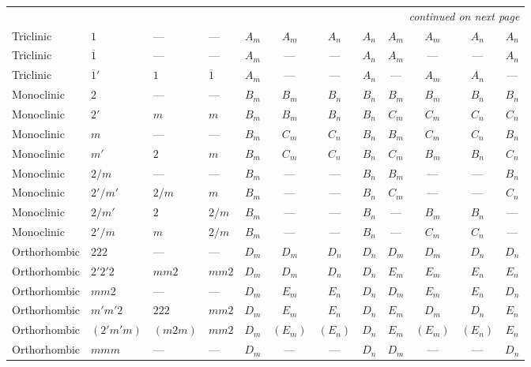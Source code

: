 \documentclass[a4paper,11pt]{article}
\newcommand{\ob}[1]{\overline{#1}}
\begin{document}
\begin{landscape}
\begin{longtable}{l l l l *{4}{c} *{4}{c}}
\midrule
\endhead
\midrule
\multicolumn{12}{r}{\footnotesize\itshape continued on next page}\\
\endfoot
\bottomrule
\endlastfoot
Triclinic & $1$ & --- & --- & $A_m$ & $A_m$ & $A_n$ & $A_n$ & $A_m$ & $A_m$ & $A_n$ & $A_n$ \\
Triclinic & $\ob{1}$ & --- & --- & $A_m$ & --- & --- & $A_n$ & $A_m$ & --- & --- & $A_n$ \\
Triclinic & $\ob{1}'$ & $1$ & $\ob{1}$ & $A_m$ & --- & --- & $A_n$ & --- & $A_m$ & $A_n$ & --- \\
\addlinespace
Monoclinic & $2$ & --- & --- & $B_m$ & $B_m$ & $B_n$ & $B_n$ & $B_m$ & $B_m$ & $B_n$ & $B_n$ \\
Monoclinic & $2'$ & $m$ & $m$ & $B_m$ & $B_m$ & $B_n$ & $B_n$ & $C_m$ & $C_m$ & $C_n$ & $C_n$ \\
Monoclinic & $m$ & --- & --- & $B_m$ & $C_m$ & $C_n$ & $B_n$ & $B_m$ & $C_m$ & $C_n$ & $B_n$ \\
Monoclinic & $m'$ & $2$ & $m$ & $B_m$ & $C_m$ & $C_n$ & $B_n$ & $C_m$ & $B_m$ & $B_n$ & $C_n$ \\
Monoclinic & $2/m$ & --- & --- & $B_m$ & --- & --- & $B_n$ & $B_m$ & --- & --- & $B_n$ \\
Monoclinic & $2'/m'$ & $2/m$ & $m$ & $B_m$ & --- & --- & $B_n$ & $C_m$ & --- & --- & $C_n$ \\
Monoclinic & $2/m'$ & $2$ & $2/m$ & $B_m$ & --- & --- & $B_n$ & --- & $B_m$ & $B_n$ & --- \\
Monoclinic & $2'/m$ & $m$ & $2/m$ & $B_m$ & --- & --- & $B_n$ & --- & $C_m$ & $C_n$ & --- \\
\addlinespace
Orthorhombic & $222$ & --- & --- & $D_m$ & $D_m$ & $D_n$ & $D_n$ & $D_m$ & $D_m$ & $D_n$ & $D_n$ \\
Orthorhombic & $2'2'2$ & $mm2$ & $mm2$ & $D_m$ & $D_m$ & $D_n$ & $D_n$ & $E_m$ & $E_m$ & $E_n$ & $E_n$ \\
Orthorhombic & $mm2$ & --- & --- & $D_m$ & $E_m$ & $E_n$ & $D_n$ & $D_m$ & $E_m$ & $E_n$ & $D_n$ \\
Orthorhombic & $m'm'2$ & $222$ & $mm2$ & $D_m$ & $E_m$ & $E_n$ & $D_n$ & $E_m$ & $D_m$ & $D_n$ & $E_n$ \\
Orthorhombic & $(2'm'm)$ & $(m2m)$ & $mm2$ & $D_m$ & $(E_m)$ & $(E_n)$ & $D_n$ & $E_m$ & $(E_m)$ & $(E_n)$ & $E_n$ \\
Orthorhombic & $mmm$ & --- & --- & $D_m$ & --- & --- & $D_n$ & $D_m$ & --- & --- & $D_n$ \\

\end{longtable}
\end{landscape}
\end{document}
